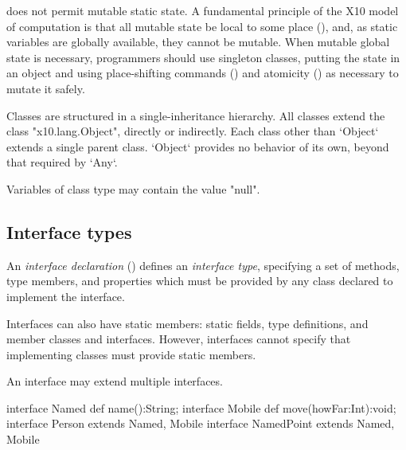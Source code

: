 \Xten{} does not permit mutable static state. A fundamental principle of the
X10 model of computation is that all mutable state be local to some place
(), and, as static variables are globally available, they
cannot be mutable. When mutable global state is necessary, programmers should
use singleton classes, putting the state in an object and using place-shifting
commands () and atomicity () as necessary
to mutate it safely.


Classes are structured in a single-inheritance hierarchy. All classes extend
the class \xcd"x10.lang.Object", directly or indirectly. Each class other than
\xcd`Object` extends a single parent class.  \xcd`Object` provides no behavior
of its own, beyond that required by \xcd`Any`.



Variables of class type may contain the value \xcd"null". 

\subsection{Interface types}
\label{InterfaceTypes}


An {\em interface declaration} () defines an {\em
interface type}, specifying a set of methods, type members, and
properties which must be provided by any class declared to implement the
interface. 


Interfaces can also have static members: static fields, type definitions,
and member classes and interfaces.  However, interfaces cannot specify that
implementing classes must provide static members.

An interface may extend multiple interfaces.  
\begin{xten}
interface Named {
  def name():String;
}
interface Mobile {
  def move(howFar:Int):void;
}
interface Person extends Named, Mobile {}
interface NamedPoint extends Named, Mobile{} 
\end{xten}
%


